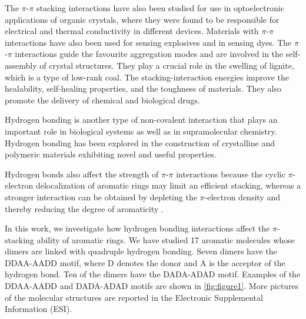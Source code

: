 \documentclass[twoside,twocolumn,9pt]{article}
\begin{document}
The $\pi$-$\pi$ stacking interactions have also been studied for use in
optoelectronic applications of organic crystals, where they were found to be
responsible for
electrical\cite{C2CC37655E,C9SC03348C,doi:10.1021/ja057198d,doi:10.1021/ja066426g,B717752F,B925259B,doi:10.1021/jp208182s,Chen2016}
and thermal conductivity\cite{SU20181} in different devices. Materials with
$\pi$-$\pi$ interactions have also been used for sensing
explosives\cite{C5CC07513K,C4RA12835D} and in sensing dyes\cite{C2OB26117K}.
The $\pi$-$\pi$ interactions guide the favourite aggregation
modes\cite{C9EN01365B}  and are involved in the self-assembly of crystal
structures\cite{VENKATESAN2019306,SHUKLA2017426}. They play a crucial role in
the swelling of lignite, which is a type of low-rank coal\cite{HOU2021120920}.
The stacking-interaction energies improve the healability, self-healing
properties, and the toughness of
materials\cite{doi:10.1021/cm102963k,https://doi.org/10.1002/marc.201700018,doi:10.1021/acssuschemeng.0c04136,doi:10.1021/acs.chemmater.9b01239}.
They also promote the delivery of chemical and biological
drugs\cite{ZHUANG2019311,doi:10.1021/jp806751k,LIANG20151,doi:10.1021/acsami.7b08534,doi:10.1021/acsnano.8b01186,https://doi.org/10.1002/adfm.201002497,SONG2018406,BAO201763,MIAO201528,LIU2016401,C7OB01975K,C8CC04363A,C4CC10226F,doi:10.1021/acsami.8b18425,doi:10.1021/nn501816z,doi:10.1021/acsnano.5b00929,doi:10.1021/ja409686x,thno20028,https://doi.org/10.1002/anie.200902612,https://doi.org/10.1002/adfm.200901245,Ge16968,doi:10.3109/1061186X.2011.639023,10.1093/jnci/djw186}.

Hydrogen bonding is another type of non-covalent interaction that plays an
important role in biological systems as well as in supramolecular
chemistry\cite{B103906G}. Hydrogen bonding has been explored in the
construction of crystalline and polymeric materials exhibiting novel and useful
properties\cite{doi:10.1021/acs.macromol.5b01990,C4PY01715C,C5SC00988J,https://doi.org/10.1002/anie.201707097}.

Hydrogen bonds also affect the strength of $\pi$-$\pi$ interactions because the
cyclic $\pi$-electron delocalization of aromatic rings may limit an efficient
stacking, whereas a stronger interaction can be obtained by depleting the
$\pi$-electron density and thereby reducing the degree of aromaticity
\cite{Bloom:11}.  

In this work, we investigate how hydrogen bonding interactions affect the
$\pi$-stacking ability of aromatic rings.  We have studied 17 aromatic
molecules whose dimers are linked with quadruple hydrogen bonding.  Seven
dimers have the DDAA-AADD motif, where D denotes the donor and A is the
acceptor of the hydrogen bond.  Ten of the dimers have the DADA-ADAD motif.
Examples of the DDAA-AADD and DADA-ADAD motifs are shown in \cref{fig:figure1}.
More pictures of the molecular structures are
reported in the Electronic Supplemental Information (ESI)\dag.
\end{document}
